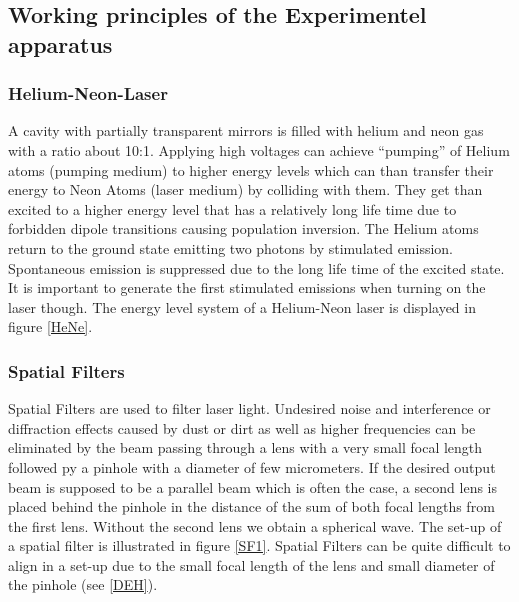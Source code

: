 \subsection{Working principles of the Experimentel apparatus}

\subsubsection{Helium-Neon-Laser}

A cavity with partially transparent mirrors is filled with helium and neon gas with a ratio about 10:1. Applying high voltages can achieve ``pumping'' of Helium atoms (pumping medium) to higher energy levels which can than transfer their energy to Neon Atoms (laser medium) by colliding with them. They get than excited to a higher energy level that has a relatively long life time due to forbidden dipole transitions causing population inversion.
The Helium atoms return to the ground state emitting two photons by stimulated emission. Spontaneous emission is suppressed due to the long life time of the excited state. It is important to generate the first stimulated emissions when turning on the laser though.
The energy level system of a Helium-Neon laser is displayed in figure \ref{HeNe}.



\subsubsection{Spatial Filters \label{SF}}

Spatial Filters are used to filter laser light. Undesired noise and interference or diffraction effects caused by dust or dirt as well as higher frequencies can be eliminated by the beam passing through a lens with a very small focal length followed py a pinhole with a diameter of few micrometers. If the desired output beam is supposed to be a parallel beam which is often the case, a second lens is placed behind the pinhole in the distance of the sum of both focal lengths from the first lens. Without the second lens we obtain a spherical wave. The set-up of a spatial filter is illustrated in figure \ref{SF1}. Spatial Filters can be quite difficult to align in a set-up due to the small focal length of the lens and small diameter of the pinhole (see \ref{DEH}).

